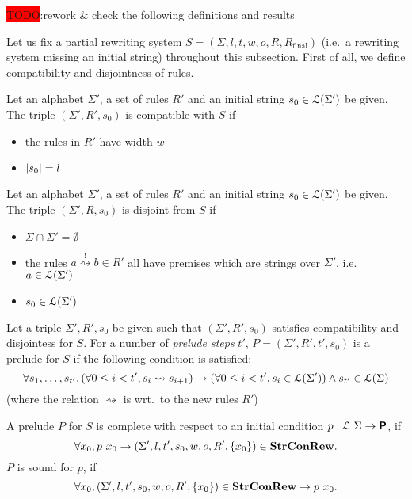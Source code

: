 \documentclass[a4paper,UKenglish,cleveref, autoref]{lipics-v2019}
\newcommand{\TODO}[1]{\colorbox{red}{\LARGE TODO}:#1}
\newcommand{\strent}{\rightsquigarrow}
\newcommand{\constrent}{\overset{!}{\rightsquigarrow}}
\newcommand{\Rfinal}{R_{\text{final}}}
\begin{document}
\TODO{rework \& check the following definitions and results}

Let us fix a partial rewriting system $S = (\Sigma, l, t, w, o, R, \Rfinal)$ (i.e.\ a rewriting system missing an initial string) throughout this subsection. 
First of all, we define compatibility and disjointness of rules. 
\begin{definition}[Compatibility]
  Let an alphabet $\Sigma'$, a set of rules $R'$ and an initial string $s_0 \in \mathcal{L} (\Sigma')$ be given. 
  The triple $(\Sigma', R', s_0)$ is compatible with $S$ if
  \begin{itemize}
    \item the rules in $R'$ have width $w$
    \item $|s_0| = l$
  \end{itemize}
\end{definition}
\begin{definition}[Disjointness]
  Let an alphabet $\Sigma'$, a set of rules $R'$ and an initial string $s_0 \in \mathcal{L} (\Sigma')$ be given. 
  The triple $(\Sigma', R, s_0)$ is disjoint from $S$ if 
  \begin{itemize}
    \item $\Sigma \cap \Sigma' = \emptyset$
    \item the rules $a \constrent{} b \in  R'$ all have premises which are strings over $\Sigma'$, i.e.\ $a \in \mathcal{L} (\Sigma')$
    \item $s_0 \in \mathcal{L} (\Sigma')$
  \end{itemize}
\end{definition}

\begin{definition}[Prelude]
  Let a triple $\Sigma', R', s_0$ be given such that $(\Sigma', R', s_0)$ satisfies compatibility and disjointess for $S$. 
  For a number of \emph{prelude steps} $t'$, $P = (\Sigma', R', t', s_0)$ is a prelude for $S$ if the following condition is satisfied:
  \[\forall s_1, \ldots, s_{t'}, (\forall 0 \le i < t', s_i \strent{} s_{i+1}) \rightarrow (\forall 0 \le i < t', s_i \in \listsofb{\Sigma'}) \land s_{t'} \in \listsofb{\Sigma} \]
  (where the relation $\strent{}$ is wrt.\ to the new rules $R'$) %
\end{definition}

\begin{definition}
  A prelude $P$ for $S$ is complete with respect to an initial condition $p : \mathcal{L}~{\Sigma} \rightarrow \textsf{\bfseries P}$, if
  \[ \forall x_0, p~x_0 \rightarrow (\Sigma', l, t', s_0, w, o, R', \{x_0\}) \in \textbf{StrConRew}{}. \]
  $P$ is sound for $p$, if 
  \[ \forall x_0, (\Sigma', l, t', s_0, w, o, R', \{x_0\}) \in \textbf{StrConRew}{} \rightarrow p~x_0. \]
\end{definition}
\end{document}
